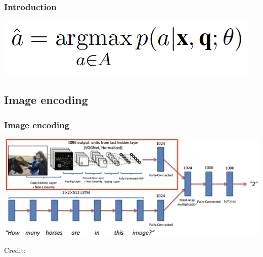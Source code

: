 \documentclass{beamer}
\begin{document}
\begin{frame}
\frametitle{Introduction}
\begin{center}
\includegraphics[scale=0.5]{./images/formula01}
\end{center}
\end{frame}


\subsection{Image encoding}
\begin{frame}
\frametitle{Image encoding}
\begin{center}
\includegraphics[scale=0.27]{./images/ImageEncoding}
\end{center}
\begin{center}
\hspace*{12pt}\hbox{\scriptsize Credit:}
\end{center}
\end{frame}
\end{document}
